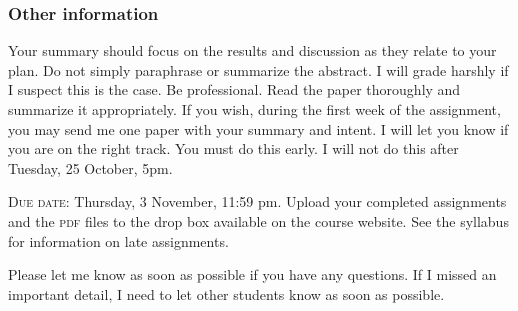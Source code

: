 \documentclass[12pt]{article}
\begin{document}
\subsubsection*{Other information}

Your summary should focus on the results and discussion as they relate to your plan. Do not simply paraphrase or summarize the abstract. I will grade harshly if I suspect this is the case. Be professional. Read the paper thoroughly and summarize it appropriately. If you wish, during the first week of the assignment, you may send me one paper with your summary and intent. I will let you know if you are on the right track. You must do this early. I will not do this after Tuesday, 25 October, 5pm.

\textsc{Due date:} Thursday, 3 November, 11:59 pm. Upload your completed assignments and the \textsc{pdf} files to the drop box available on the course website. See the syllabus for information on late assignments.

\vspace*{\baselineskip}

Please let me know as soon as possible if you have any questions. If I missed an important detail, I need to let other students know as soon as possible.
\end{document}
